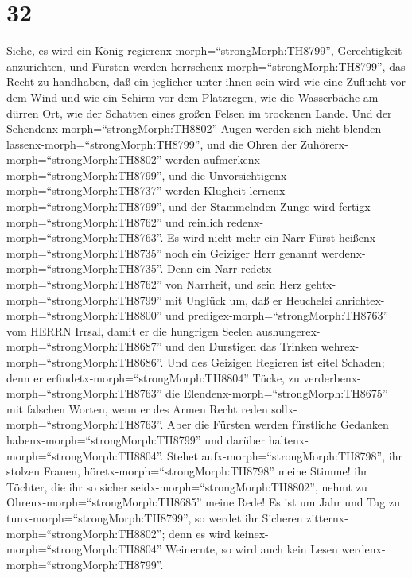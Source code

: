 \hypertarget{section-31}{%
\section{32}\label{section-31}}

 Siehe, es wird ein König
regierenx-morph=``strongMorph:TH8799'', Gerechtigkeit anzurichten, und
Fürsten werden herrschenx-morph=``strongMorph:TH8799'', das Recht zu
handhaben,  daß ein jeglicher unter ihnen sein wird wie eine
Zuflucht vor dem Wind und wie ein Schirm vor dem Platzregen, wie die
Wasserbäche am dürren Ort, wie der Schatten eines großen Felsen im
trockenen Lande.  Und der
Sehendenx-morph=``strongMorph:TH8802'' Augen werden sich nicht blenden
lassenx-morph=``strongMorph:TH8799'', und die Ohren der
Zuhörerx-morph=``strongMorph:TH8802'' werden
aufmerkenx-morph=``strongMorph:TH8799'',  und die
Unvorsichtigenx-morph=``strongMorph:TH8737'' werden Klugheit
lernenx-morph=``strongMorph:TH8799'', und der Stammelnden Zunge wird
fertigx-morph=``strongMorph:TH8762'' und reinlich
redenx-morph=``strongMorph:TH8763''.  Es wird nicht mehr ein
Narr Fürst heißenx-morph=``strongMorph:TH8735'' noch ein Geiziger Herr
genannt werdenx-morph=``strongMorph:TH8735''.  Denn ein Narr
redetx-morph=``strongMorph:TH8762'' von Narrheit, und sein Herz
gehtx-morph=``strongMorph:TH8799'' mit Unglück um, daß er Heuchelei
anrichtex-morph=``strongMorph:TH8800'' und
predigex-morph=``strongMorph:TH8763'' vom HERRN Irrsal, damit er die
hungrigen Seelen aushungerex-morph=``strongMorph:TH8687'' und den
Durstigen das Trinken wehrex-morph=``strongMorph:TH8686''. 
Und des Geizigen Regieren ist eitel Schaden; denn er
erfindetx-morph=``strongMorph:TH8804'' Tücke, zu
verderbenx-morph=``strongMorph:TH8763'' die
Elendenx-morph=``strongMorph:TH8675'' mit falschen Worten, wenn er des
Armen Recht reden sollx-morph=``strongMorph:TH8763''.  Aber
die Fürsten werden fürstliche Gedanken
habenx-morph=``strongMorph:TH8799'' und darüber
haltenx-morph=``strongMorph:TH8804''.  Stehet
aufx-morph=``strongMorph:TH8798'', ihr stolzen Frauen,
höretx-morph=``strongMorph:TH8798'' meine Stimme! ihr Töchter, die ihr
so sicher seidx-morph=``strongMorph:TH8802'', nehmt zu
Ohrenx-morph=``strongMorph:TH8685'' meine Rede!  Es ist um
Jahr und Tag zu tunx-morph=``strongMorph:TH8799'', so werdet ihr
Sicheren zitternx-morph=``strongMorph:TH8802''; denn es wird
keinex-morph=``strongMorph:TH8804'' Weinernte, so wird auch kein Lesen
werdenx-morph=``strongMorph:TH8799''. 
